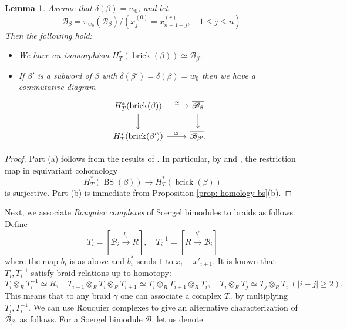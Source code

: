\documentclass[10pt]{amsart}
\theoremstyle{plain}
\newtheorem{lemma}[thm]{Lemma}
\theoremstyle{definition}
\theoremstyle{remark}
\numberwithin{equation}{section}
\newcommand{\SB}{\mathscr{B}}
\newcommand{\brick}{\operatorname{brick}}
\DeclareMathOperator{\BS}{BS}
\begin{document}
\begin{lemma}
\label{lem: homology brick}
Assume that $\delta(\beta)=w_0$, and let 
$$
\overline{\SB_{\beta}}=\pi_{w_0}(\SB_{\beta})/\left(x^{(0)}_{j}=x^{(r)}_{n+1-j},\quad 1\le j\le n\right).
$$
Then the following hold:
\begin{itemize}
    \item[(a)] We have an isomorphism $H^*_T(\brick(\beta))\simeq\overline{\SB_{\beta}}$.\\
\item[(b)] If $\beta'$ is a subword of $\beta$ with $\delta(\beta')=\delta(\beta)=w_0$ then we have a commutative diagram
$$
\begin{tikzcd}
H^*_T(\brick(\beta)) \arrow{r}{\simeq} \arrow{d}& \overline{\SB_{\beta}} \arrow{d}\\
H^*_T(\brick(\beta')) \arrow{r}{\simeq}  & \overline{\SB_{\beta'}}.
\end{tikzcd}
$$
\end{itemize}
\end{lemma}

\begin{proof}
Part (a) follows from the results of \cite{Harterich,Shchigolev}. 
In particular, by \cite[Corollary 6.5(b)]{Harterich} and \cite[Corollary 4.12]{Shchigolev}, the restriction map in equivariant cohomology
$$
H^*_T(\BS(\beta))\to H^*_T(\brick(\beta))
$$
is surjective. %
Part (b) is immediate from Proposition \ref{prop: homology bs}(b).
\end{proof}

Next, we associate {\em Rouquier complexes} \cite{Rouquier06} of Soergel bimodules to braids as follows. Define
$$
T_i=[\SB_i\xrightarrow{b_i} R],\quad T_i^{-1}=[R\xrightarrow{b_i^*} \SB_i]
$$
    where the map $b_i$ is as above and $b^*_i$ sends $1$ to $x_i-x'_{i+1}$. It is known \cite{Rouquier06,soergelbook} that $T_i,T^{-1}_i$ satisfy braid relations up to homotopy:
$$
T_i\otimes_R T_i^{-1}\simeq R, \quad T_{i+1}\otimes_R T_i\otimes_R T_{i+1}\simeq T_{i}\otimes_R T_{i+1}\otimes_R T_i,\quad T_i\otimes_R T_j\simeq T_j\otimes_R T_i\ (|i-j|\ge 2).
$$
This means that to any braid $\gamma$ one can associate a complex $T_{\gamma}$ by multiplying $T_i,T_i^{-1}$. We can use Rouquier complexes to give an alternative characterization of $\overline{\SB_{\beta}}$, as follows. For a Soergel bimodule $\SB$, let us denote
\end{document}
